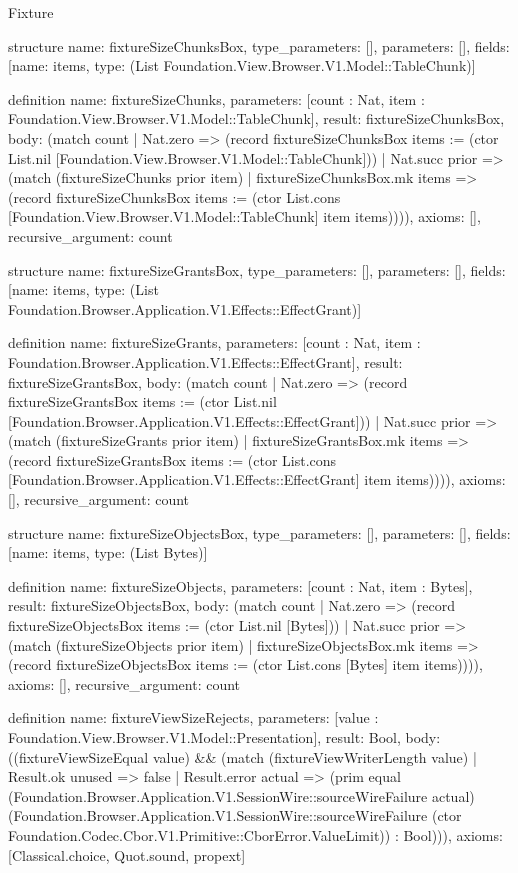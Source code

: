 \begin{lexlean}{Fixture}
\begin{semanticmodule}
structure{
  name: fixtureSizeChunksBox,
  type_parameters: [],
  parameters: [],
  fields: [{name: items, type: (List Foundation.View.Browser.V1.Model::TableChunk)}]
}

definition{
  name: fixtureSizeChunks,
  parameters: [count : Nat, item : Foundation.View.Browser.V1.Model::TableChunk],
  result: fixtureSizeChunksBox,
  body: (match count
    | Nat.zero => (record fixtureSizeChunksBox {items := (ctor List.nil [Foundation.View.Browser.V1.Model::TableChunk])})
    | Nat.succ prior => (match (fixtureSizeChunks prior item)
      | fixtureSizeChunksBox.mk items => (record fixtureSizeChunksBox {items := (ctor List.cons [Foundation.View.Browser.V1.Model::TableChunk] item items)}))),
  axioms: [],
  recursive_argument: count
}

structure{
  name: fixtureSizeGrantsBox,
  type_parameters: [],
  parameters: [],
  fields: [{name: items, type: (List Foundation.Browser.Application.V1.Effects::EffectGrant)}]
}

definition{
  name: fixtureSizeGrants,
  parameters: [count : Nat, item : Foundation.Browser.Application.V1.Effects::EffectGrant],
  result: fixtureSizeGrantsBox,
  body: (match count
    | Nat.zero => (record fixtureSizeGrantsBox {items := (ctor List.nil [Foundation.Browser.Application.V1.Effects::EffectGrant])})
    | Nat.succ prior => (match (fixtureSizeGrants prior item)
      | fixtureSizeGrantsBox.mk items => (record fixtureSizeGrantsBox {items := (ctor List.cons [Foundation.Browser.Application.V1.Effects::EffectGrant] item items)}))),
  axioms: [],
  recursive_argument: count
}

structure{
  name: fixtureSizeObjectsBox,
  type_parameters: [],
  parameters: [],
  fields: [{name: items, type: (List Bytes)}]
}

definition{
  name: fixtureSizeObjects,
  parameters: [count : Nat, item : Bytes],
  result: fixtureSizeObjectsBox,
  body: (match count
    | Nat.zero => (record fixtureSizeObjectsBox {items := (ctor List.nil [Bytes])})
    | Nat.succ prior => (match (fixtureSizeObjects prior item)
      | fixtureSizeObjectsBox.mk items => (record fixtureSizeObjectsBox {items := (ctor List.cons [Bytes] item items)}))),
  axioms: [],
  recursive_argument: count
}

definition{
  name: fixtureViewSizeRejects,
  parameters: [value : Foundation.View.Browser.V1.Model::Presentation],
  result: Bool,
  body: ((fixtureViewSizeEqual value) && (match (fixtureViewWriterLength value)
    | Result.ok unused => false
    | Result.error actual => (prim equal (Foundation.Browser.Application.V1.SessionWire::sourceWireFailure actual) (Foundation.Browser.Application.V1.SessionWire::sourceWireFailure (ctor Foundation.Codec.Cbor.V1.Primitive::CborError.ValueLimit)) : Bool))),
  axioms: [Classical.choice, Quot.sound, propext]
}


\end{semanticmodule}
\end{lexlean}
